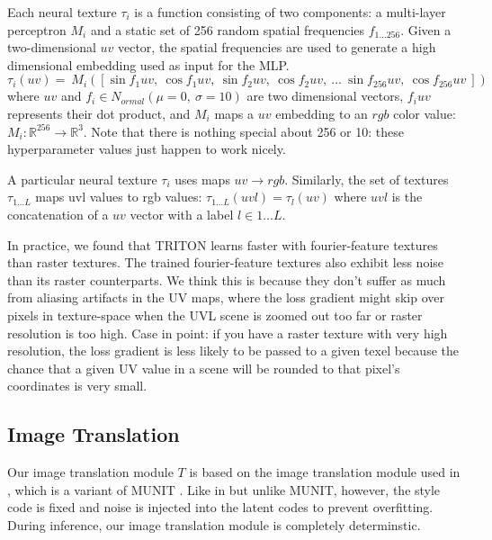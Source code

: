 \documentclass{article}
\begin{document}
	Each neural texture $\tau_i$ is a function consisting of two components: a multi-layer perceptron $M_i$ and a static set of 256 random spatial frequencies $f_{1...256}$. 
	Given a two-dimensional $uv$ vector, the spatial frequencies are used to generate a high dimensional embedding used as input for the MLP.
	\begin{equation}
			\tau_i(uv) = 
			\
			M_i\left(\left[
				\sin f_1 uv, \ 
				\cos f_1 uv, \ 
				\sin f_2 uv, \ 
				\cos f_2 uv, \ 
				\dots \ 
				\sin f_{256} uv, \ 
				\cos f_{256} uv \ 
			\right]\right)
	\end{equation}
	where $uv$ and $f_i \in N_{ormal}(\mu=0,\ \sigma=10)$ are two dimensional vectors,
	 $f_i uv$ represents their dot product, 
	 and $M_i$ maps a $uv$ embedding to an $rgb$ color value:
	 $M_i: \mathbb{R}^{256} \rightarrow \mathbb{R}^3$.
	Note that there is nothing special about 256 or 10: these hyperparameter values just happen to work nicely.
	
	A particular neural texture $\tau_i$ uses maps $uv \rightarrow rgb$. Similarly, the set of textures $\tau_{1\dots L}$ maps uvl values to rgb values: $\tau_{1\dots L}(uvl)=\tau_l(uv)$ where $uvl$ is the concatenation of a $uv$ vector with a label $l \in 1\dots L$.
	
	In practice, we found that TRITON learns faster with fourier-feature textures than raster textures. The trained fourier-feature textures also exhibit less noise than its raster counterparts. We think this is because they don't suffer as much from aliasing artifacts in the UV maps, where the loss gradient might skip over pixels in texture-space when the UVL scene is zoomed out too far or raster resolution is too high. Case in point: if you have a raster texture with very high resolution, the loss gradient is less likely to be passed to a given texel because the chance that a given UV value in a scene will be rounded to that pixel's coordinates is very small.




\subsection{Image Translation}
Our image translation module $T$ is based on the image translation module used in \citep{surgical_video_translation}, which is a variant of MUNIT \cite{munit}. Like in \citep{surgical_video_translation} but unlike MUNIT, however, the style code is fixed and noise is injected into the latent codes to prevent overfitting. During inference, our image translation module is completely determinstic.
\end{document}
